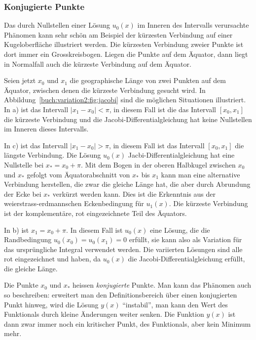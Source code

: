 %
%
\subsubsection{Konjugierte Punkte}

Das durch Nullstellen einer Lösung $u_0(x)$ im Inneren des Intervalls
verursachte Phänomen kann sehr schön am Beispiel der kürzesten
Verbindung auf einer Kugeloberfläche illustriert werden.
Die kürzesten Verbindung zweier Punkte ist dort immer ein Grosskreisbogen.
Liegen die Punkte auf dem Äquator, dann liegt in Normalfall auch die
kürzeste Verbindung auf dem Äquator.

Seien jetzt $x_0$ und $x_1$ die geographische Länge von zwei Punkten
auf dem Äquator, zwischen denen die kürzeste Verbindung gesucht wird.
In Abbildung~\ref{buch:variation2:fig:jacobi} sind die möglichen
Situationen illustriert.
In a) ist das Intervall $|x_1-x_0|<\pi$, in diesem Fall ist die
das Intervall $[x_0,x_1]$ die kürzeste Verbindung und die 
Jacobi-Differentialgleichung hat keine Nullstellen im Inneren 
dieses Intervalls.

In c) ist das Intervall $|x_1-x_0|>\pi$, in diesem Fall ist das Intervall
$[x_0,x_1]$ die längste Verbindung.
Die Lösung $u_0(x)$ Jacbi-Differentialgleichung hat eine Nullstelle
bei $x_*=x_0+\pi$.
Mit dem Bogen in der oberen Halbkugel zwischen $x_0$ und $x_*$
gefolgt vom Äquatorabschnitt von $x_*$ bis $x_1$ kann man eine
alternative Verbindung herstellen, die zwar die gleiche Länge hat,
die aber durch Abrundung der Ecke bei $x_*$ verkürzt werden kann.
Dies ist die Erkenntnis aus der weierstrass-erdmannschen
Eckenbedingung für $u_1(x)$.
Die kürzeste Verbindung ist der komplementäre, rot eingezeichnete
Teil des Äquators.

In b) ist $x_1=x_0+\pi$.
In diesem Fall ist $u_0(x)$ eine Lösung, die die Randbedingung
$u_0(x_0)=u_0(x_1)=0$ erfüllt, sie kann also als Variation
für das ursprüngliche Integral verwendet werden.
Die variierten Lösungen sind alle rot eingezeichnet und haben,
da $u_0(x)$ die Jacobi-Differentialgleichung erfüllt, die gleiche
Länge.

Die Punkte $x_0$ und $x_*$ heissen {\em konjugierte} Punkte.
%
Man kann das Phänomen auch so beschreiben: erweitert man den
Definitionsbereich über einen konjugierten Punkt hinweg, wird die
Lösung $y(x)$ ``instabil'', man kann den Wert des Funktionals
durch kleine Änderungen weiter senken.
Die Funktion $y(x)$ ist dann zwar immer noch ein kritischer Punkt,
des Funktionals, aber kein Minimum mehr.

